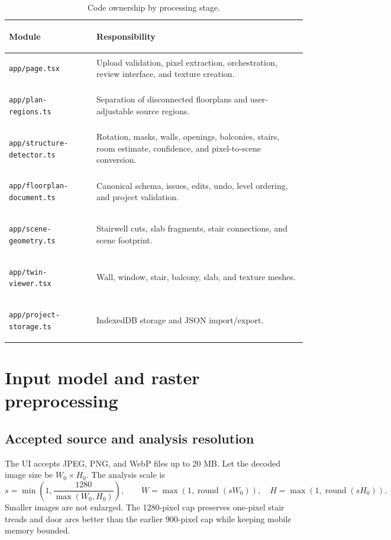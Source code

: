 \documentclass[11pt,a4paper]{article}
\newcommand{\code}[1]{\texttt{#1}}
\begin{document}
\begin{table}[htbp]
\centering
\caption{Code ownership by processing stage.}
\label{tab:modules}
\small
\begin{tabularx}{\textwidth}{@{}>{\bfseries\raggedright\arraybackslash}p{52mm}X@{}}
\toprule
Module & Responsibility \\
\midrule
\code{app/page.tsx} & Upload validation, pixel extraction, orchestration, review interface, and texture creation. \\
\code{app/plan-regions.ts} & Separation of disconnected floorplans and user-adjustable source regions. \\
\code{app/structure-detector.ts} & Rotation, masks, walls, openings, balconies, stairs, room estimate, confidence, and pixel-to-scene conversion. \\
\code{app/floorplan-document.ts} & Canonical schema, issues, edits, undo, level ordering, and project validation. \\
\code{app/scene-geometry.ts} & Stairwell cuts, slab fragments, stair connections, and scene footprint. \\
\code{app/twin-viewer.tsx} & Wall, window, stair, balcony, slab, and texture meshes. \\
\code{app/project-storage.ts} & IndexedDB storage and JSON import/export. \\
\bottomrule
\end{tabularx}
\end{table}

\section{Input model and raster preprocessing}

\subsection{Accepted source and analysis resolution}

The UI accepts JPEG, PNG, and WebP files up to 20 MB. Let the decoded image size be $W_0\times H_0$. The analysis scale is
\begin{equation}
s=\min\left(1,\frac{1280}{\max(W_0,H_0)}\right),\qquad
W=\max(1,\operatorname{round}(sW_0)),\quad
H=\max(1,\operatorname{round}(sH_0)).
\end{equation}
Smaller images are not enlarged. The 1280-pixel cap preserves one-pixel stair treads and door arcs better than the earlier 900-pixel cap while keeping mobile memory bounded.
\end{document}
